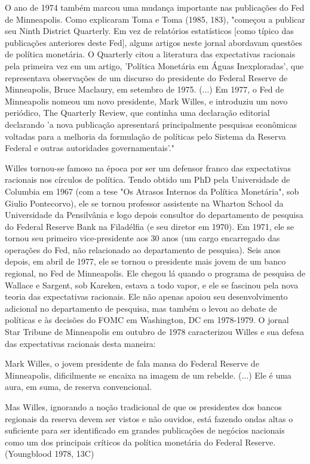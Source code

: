 \documentclass[a4paper,12pt]{article}[abntex2]
\begin{document}
O ano de 1974 também marcou uma mudança importante nas publicações do Fed de Minneapolis. Como explicaram Toma e Toma (1985, 183), "começou a publicar seu Ninth District Quarterly. Em vez de relatórios estatísticos [como típico das publicações anteriores deste Fed], alguns artigos neste jornal abordavam questões de política monetária. O Quarterly citou a literatura das expectativas racionais pela primeira vez em um artigo, 'Política Monetária em Águas Inexploradas', que representava observações de um discurso do presidente do Federal Reserve de Minneapolis, Bruce Maclaury, em setembro de 1975. (...) Em 1977, o Fed de Minneapolis nomeou um novo presidente, Mark Willes, e introduziu um novo periódico, The Quarterly Review, que continha uma declaração editorial declarando 'a nova publicação apresentará principalmente pesquisas econômicas voltadas para a melhoria da formulação de políticas pelo Sistema da Reserva Federal e outras autoridades governamentais'."

Willes tornou-se famoso na época por ser um defensor franco das expectativas racionais nos círculos de política. Tendo obtido um PhD pela Universidade de Columbia em 1967 (com a tese "Os Atrasos Internos da Política Monetária", sob Giulio Pontecorvo), ele se tornou professor assistente na Wharton School da Universidade da Pensilvânia e logo depois consultor do departamento de pesquisa do Federal Reserve Bank na Filadélfia (e seu diretor em 1970). Em 1971, ele se tornou seu primeiro vice-presidente aos 30 anos (um cargo encarregado das operações do Fed, não relacionado ao departamento de pesquisa). Seis anos depois, em abril de 1977, ele se tornou o presidente mais jovem de um banco regional, no Fed de Minneapolis. Ele chegou lá quando o programa de pesquisa de Wallace e Sargent, sob Kareken, estava a todo vapor, e ele se fascinou pela nova teoria das expectativas racionais. Ele não apenas apoiou seu desenvolvimento adicional no departamento de pesquisa, mas também o levou ao debate de políticas e às decisões do FOMC em Washington, DC em 1978-1979. O jornal Star Tribune de Minneapolis em outubro de 1978 caracterizou Willes e sua defesa das expectativas racionais desta maneira:

Mark Willes, o jovem presidente de fala mansa do Federal Reserve de Minneapolis, dificilmente se encaixa na imagem de um rebelde. (...) Ele é uma aura, em suma, de reserva convencional.

Mas Willes, ignorando a noção tradicional de que os presidentes dos bancos regionais da reserva devem ser vistos e não ouvidos, está fazendo ondas altas o suficiente para ser identificado em grandes publicações de negócios nacionais como um dos principais críticos da política monetária do Federal Reserve. (Youngblood 1978, 13C)
\end{document}
